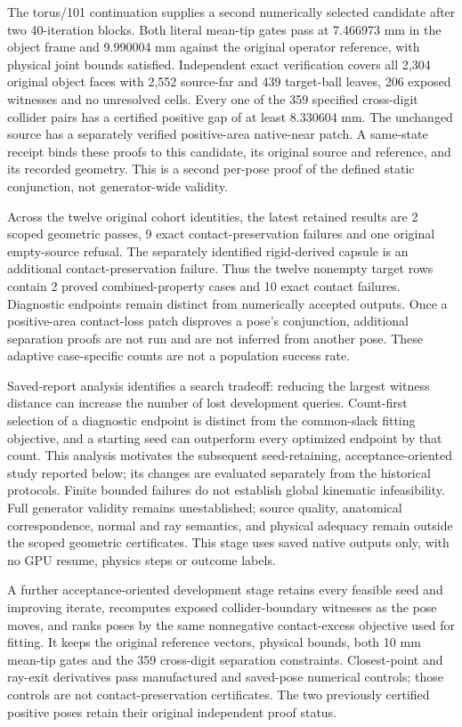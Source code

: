 \documentclass[10pt,letterpaper]{article}
\begin{document}
The torus/101 continuation supplies a second numerically selected candidate
after two 40-iteration blocks. Both literal mean-tip gates pass at
7.466973 mm in the object frame and 9.990004 mm against the original operator
reference, with physical joint bounds satisfied. Independent exact verification
covers all 2,304 original object faces with 2,552 source-far and 439 target-ball
leaves, 206 exposed witnesses and no unresolved cells. Every one of the 359
specified cross-digit collider pairs has a certified positive gap of at least
8.330604 mm. The unchanged source has a separately verified positive-area
native-near patch. A same-state receipt binds these proofs to this candidate,
its original source and reference, and its recorded geometry. This is a second
per-pose proof of the defined static conjunction, not generator-wide validity.

Across the twelve original cohort identities, the latest retained results are
2 scoped geometric passes, 9 exact contact-preservation failures and one
original empty-source refusal. The separately identified rigid-derived capsule
is an additional contact-preservation failure. Thus the twelve nonempty target
rows contain 2 proved combined-property cases and 10 exact contact failures.
Diagnostic endpoints remain distinct from numerically accepted outputs.
Once a positive-area contact-loss patch disproves a pose's conjunction,
additional separation proofs are not run and are not inferred from another
pose. These adaptive case-specific counts are not a population success rate.

Saved-report analysis identifies a search tradeoff: reducing the largest witness
distance can increase the number of lost development queries. Count-first
selection of a diagnostic endpoint is distinct from the common-slack fitting
objective, and a starting seed can outperform every optimized endpoint by
that count. This analysis motivates the subsequent seed-retaining,
acceptance-oriented study reported below; its changes are evaluated separately
from the historical protocols. Finite bounded failures do not establish global kinematic
infeasibility. Full generator validity remains unestablished; source quality,
anatomical correspondence, normal and ray semantics, and physical adequacy
remain outside the scoped geometric certificates. This stage uses saved
native outputs only, with no GPU resume, physics steps or outcome labels.

A further acceptance-oriented development stage retains every feasible seed and
improving iterate, recomputes exposed collider-boundary witnesses as the pose
moves, and ranks poses by the same nonnegative contact-excess objective used for
fitting. It keeps the original reference vectors, physical bounds, both 10 mm
mean-tip gates and the 359 cross-digit separation constraints. Closest-point
and ray-exit derivatives pass manufactured and saved-pose numerical controls;
those controls are not contact-preservation certificates. The two previously
certified positive poses retain their original independent proof status.
\end{document}
